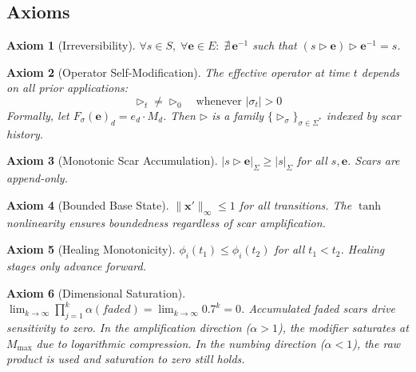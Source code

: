 \documentclass[11pt]{article}
\newtheorem{axiom}{Axiom}[section]
\begin{document}
\subsection{Axioms}

\begin{axiom}[Irreversibility]
\label{ax:scar-irrev}
$\forall s \in S,\; \forall \mathbf{e} \in E:\; \nexists\, \mathbf{e}^{-1}$ such that $(s \triangleright \mathbf{e}) \triangleright \mathbf{e}^{-1} = s$.
\end{axiom}

\begin{axiom}[Operator Self-Modification]
\label{ax:scar-selfmod}
The effective operator at time $t$ depends on all prior applications:
\begin{equation}
\triangleright_t \neq \triangleright_0 \quad \text{whenever } |\sigma_t| > 0
\end{equation}
Formally, let $F_\sigma(\mathbf{e})_d = e_d \cdot M_d$. Then $\triangleright$ is a family $\{\triangleright_\sigma\}_{\sigma \in \Sigma^*}$ indexed by scar history.
\end{axiom}

\begin{axiom}[Monotonic Scar Accumulation]
\label{ax:scar-mono}
$|s \triangleright \mathbf{e}|_\Sigma \geq |s|_\Sigma$ for all $s, \mathbf{e}$. Scars are append-only.
\end{axiom}

\begin{axiom}[Bounded Base State]
\label{ax:scar-bounded}
$\|\mathbf{x}'\|_\infty \leq 1$ for all transitions. The $\tanh$ nonlinearity ensures boundedness regardless of scar amplification.
\end{axiom}

\begin{axiom}[Healing Monotonicity]
\label{ax:scar-heal}
$\phi_i(t_1) \leq \phi_i(t_2)$ for all $t_1 < t_2$. Healing stages only advance forward.
\end{axiom}

\begin{axiom}[Dimensional Saturation]
\label{ax:scar-sat}
$\lim_{k \to \infty} \prod_{j=1}^k \alpha(faded) = \lim_{k \to \infty} 0.7^k = 0$. Accumulated faded scars drive sensitivity to zero. In the amplification direction ($\alpha > 1$), the modifier saturates at $M_{\max}$ due to logarithmic compression. In the numbing direction ($\alpha < 1$), the raw product is used and saturation to zero still holds.
\end{axiom}
\end{document}
